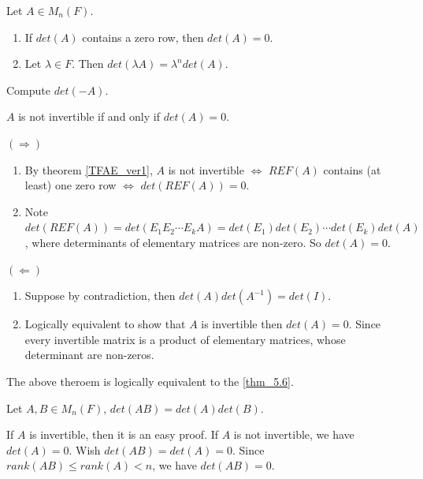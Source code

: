 \documentclass[12pt]{article}
\begin{document}
\begin{theorem}
Let $A\in M_n(F).$
\begin{enumerate}
    \item If $det(A)$ contains a zero row, then $det(A)=0$.
    \item Let $\lambda\in F$. Then $det(\lambda A) = \lambda^n det(A)$.
\end{enumerate}
\end{theorem}

\begin{exercise}
    Compute $det(-A)$.
\end{exercise}

\begin{theorem}
    $A$ is not invertible if and only if $det(A)=0$.
\end{theorem}
\begin{pf}
    $(\Rightarrow)$
    \begin{enumerate}
        \item By theorem \eqref{TFAE_ver1}, $A$ is not invertible $\Leftrightarrow$ $REF(A)$ contains (at least) one zero row $\Leftrightarrow$ $det(REF(A))=0$.
        \item Note $det(REF(A))=det(E_1 E_2 \cdots E_k A)=det(E_1)det(E_2)\cdots det(E_k)det(A)$, where determinants of elementary matrices are non-zero. So $det(A)=0$.
    \end{enumerate}
    $(\Leftarrow)$
    \begin{enumerate}
        \item Suppose by contradiction, then $det(A)det(A^{-1})=det(I)$.
        \item Logically equivalent to show that $A$ is invertible then $det(A)=0$. Since every invertible matrix is a product of elementary matrices, whose determinant are non-zeros.
    \end{enumerate}
    \end{pf}

\begin{remark}
    The above theroem is logically equivalent to the \eqref{thm_5.6}.
\end{remark}


\begin{theorem}
    Let $A,B\in M_n(F)$, $det(AB)=det(A)det(B).$
\end{theorem}

\begin{pf}
    If $A$ is invertible, then it is an easy proof.
    If $A$ is not invertible, we have $det(A)=0$.
    Wish $det(AB)=det(A)=0.$ Since $rank(AB)\leq rank(A)<n$, we have $det(AB)=0.$
\end{pf}
\end{document}
